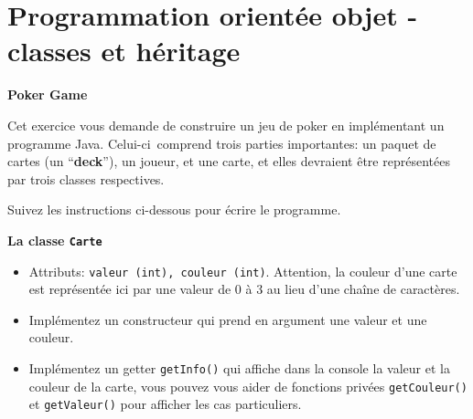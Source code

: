     


\section{Programmation orientée objet - classes et héritage}

\begin{Exercice}[15 minutes]\textbf{Poker Game}

    Cet exercice vous demande de construire un jeu de poker en implémentant un programme Java. Celui-ci~comprend trois parties importantes: un paquet de cartes (un ``\textbf{deck}''), un joueur, et une carte, et elles devraient être représentées par trois classes respectives.
    
    Suivez les instructions ci-dessous pour écrire le programme.
    
    \textbf{La classe \lstinline{Carte}}
    \begin{itemize}
        \item Attributs: \lstinline{valeur (int), couleur (int)}. Attention, la couleur d'une carte est représentée ici par une valeur de 0 à 3 au lieu d'une chaîne de caractères.
        \item Implémentez un constructeur qui prend en argument une valeur et une couleur.
        \item Implémentez un getter \lstinline{getInfo()} qui affiche dans la console la valeur et la couleur de la carte, vous pouvez vous aider de fonctions privées
        \lstinline{getCouleur()} et \lstinline{getValeur()} pour afficher les cas particuliers.
    \end{itemize}
    
    
    

\end{Exercice}
